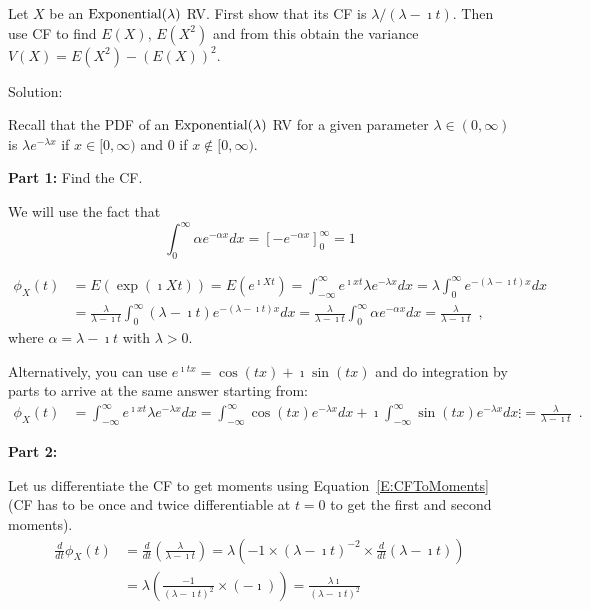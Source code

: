 \begin{example}
Let $X$ be an $\mbox{{\rm Exponential}}(\lambda)$ RV. 
First show that its CF is $\lambda/(\lambda- \imath t)$.  
Then use CF to find $E(X)$, $E(X^2)$ and from this obtain the variance $V(X) = E(X^2)-(E(X))^2$.

Solution:

Recall that the PDF of an $\mbox{{\rm Exponential}}(\lambda)$ RV for a given parameter $\lambda \in (0,\infty)$ is $\lambda e^{-\lambda x}$ if $x \in [0, \infty)$ and $0$ if $x \notin [0, \infty)$.

{\bf Part 1:} Find the CF.

We will use the fact that 
$$\int_0^{\infty} \alpha e^{-\alpha x} dx = \left[ -e^{-\alpha x} \right]_0^{\infty} = 1$$

\begin{align*}
\phi_X(t)
&= E(\exp(\imath X t))
= E\left( e^{\imath X t} \right)
= \int_{-\infty}^{\infty} e^{\imath x t} \lambda e^{-\lambda x} dx
= \lambda  \int_{0}^{\infty} e^{-(\lambda-\imath t) x} dx\\
&= \frac{\lambda}{\lambda-\imath t}  \int_{0}^{\infty} (\lambda-\imath t) e^{-(\lambda-\imath t) x} dx
= \frac{\lambda}{\lambda-\imath t}  \int_{0}^{\infty} \alpha e^{-\alpha x} dx
= \frac{\lambda}{\lambda-\imath t} \enspace, 
\end{align*}
where $\alpha = \lambda-\imath t$ with $\lambda > 0$.

Alternatively, you can use $e^{\imath t x} = \cos(tx)+\imath \sin(tx)$ and do integration by parts to arrive at the same answer starting from:
\begin{align*}
\phi_X(t)
&= \int_{-\infty}^{\infty} e^{\imath x t} \lambda e^{-\lambda x} dx
= \int_{-\infty}^{\infty} \cos(t x) e^{-\lambda x} dx + \imath \int_{-\infty}^{\infty} \sin(t x) e^{-\lambda x} dx
\vdots 
= \frac{\lambda}{\lambda-\imath t} \enspace .
\end{align*}

{\bf Part 2:}

Let us differentiate the CF to get moments using Equation~\eqref{E:CFToMoments} (CF has to be once and twice differentiable at $t=0$ to get the first and second moments).
\begin{align*}
\frac{d}{dt}\phi_X(t)
&= \frac{d}{dt}\left( \frac{\lambda}{\lambda-\imath t} \right) 
= \lambda \left( -1 \times (\lambda-\imath t)^{-2} \times \frac{d}{dt} (\lambda-\imath t) \right) \\
&= \lambda \left( \frac{-1}{(\lambda-\imath t)^{2}} \times (-\imath ) \right) 
= \frac{\lambda \imath}{(\lambda-\imath t)^{2}} 
\end{align*}


\end{example}
